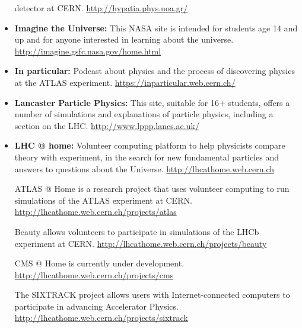 \begin{itemize}
  detector at CERN. \url{http://hypatia.phys.uoa.gr/}
\item
  \textbf{Imagine the Universe:} This NASA site is intended for students
  age 14 and up and for anyone interested in learning about the
  universe. \url{http://imagine.gsfc.nasa.gov/home.html}
\item
  \textbf{In particular:} Podcast about physics and the process of
  discovering physics at the ATLAS experiment.
  \url{https://inparticular.web.cern.ch/}
\item
  \textbf{Lancaster Particle Physics:} This site, suitable for 16+
  students, offers a number of simulations and explanations of particle
  physics, including a section on the LHC.
  \url{http://www.lppp.lancs.ac.uk/}
\item
  \textbf{LHC @ home:} Volunteer computing platform to help physicists
  compare theory with experiment, in the search for new fundamental
  particles and answers to questions about the Universe.
  \url{http://lhcathome.web.cern.ch}

  ATLAS @ Home is a research project that uses volunteer computing to
  run simulations of the ATLAS experiment at CERN.
  \url{http://lhcathome.web.cern.ch/projects/atlas}

  Beauty allows volunteers to participate in simulations of the LHCb
  experiment at CERN. \url{http://lhcathome.web.cern.ch/projects/beauty}

  CMS @ Home is currently under development.
  \url{http://lhcathome.web.cern.ch/projects/cms}

  The SIXTRACK project allows users with Internet-connected computers to
  participate in advancing Accelerator Physics.
  \url{http://lhcathome.web.cern.ch/projects/sixtrack}


\end{itemize}
